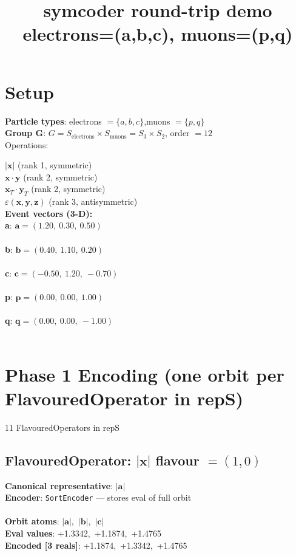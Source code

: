 \documentclass[a4paper,11pt]{article}
\title{symcoder round-trip demo\\\large electrons=(a,b,c),  muons=(p,q)}
\date{}
\newcommand{\vc}[1]{\ensuremath{\mathbf{#1}}}
\newcommand{\dnfagmiihhiejm}[1]{|\vc{#1}|}
\newcommand{\pdcegfomjfhook}[2]{\mathbf{#1} \cdot \mathbf{#2}}
\newcommand{\fpbeomcfokjooi}[2]{\mathbf{#1}_T \cdot \mathbf{#2}_T}
\newcommand{\kblbmcpggoncpf}[3]{\varepsilon(\mathbf{#1},\mathbf{#2},\mathbf{#3})}
\begin{document}
\maketitle

\section{Setup}
\textbf{Particle types}: electrons $= \{a, b, c\}$,\quad muons $= \{p, q\}$\\
\textbf{Group G}: $G = S_{\text{electrons}} \times S_{\text{muons}} = S_{3} \times S_{2}$, order $= 12$\\

Operations:

$\dnfagmiihhiejm{x}$ \quad (rank 1, symmetric)\\
$\pdcegfomjfhook{x}{y}$ \quad (rank 2, symmetric)\\
$\fpbeomcfokjooi{x}{y}$ \quad (rank 2, symmetric)\\
$\kblbmcpggoncpf{x}{y}{z}$ \quad (rank 3, antisymmetric)\\

\textbf{Event vectors (3-D):}\\
\textbf{  a}: $\vc{a} = (1.20,\ 0.30,\ 0.50)$\\\\
\textbf{  b}: $\vc{b} = (0.40,\ 1.10,\ 0.20)$\\\\
\textbf{  c}: $\vc{c} = (-0.50,\ 1.20,\ -0.70)$\\\\
\textbf{  p}: $\vc{p} = (0.00,\ 0.00,\ 1.00)$\\\\
\textbf{  q}: $\vc{q} = (0.00,\ 0.00,\ -1.00)$\\\\

\section{Phase 1 Encoding  (one orbit per FlavouredOperator in repS)}
  11 FlavouredOperators in repS


\subsection{FlavouredOperator: $\dnfagmiihhiejm{x}$  flavour $= (1, 0)$}
\textbf{  Canonical representative}: $\displaystyle\dnfagmiihhiejm{a}$\\
\textbf{  Encoder}: \texttt{SortEncoder} — stores eval of full orbit\\\\
\textbf{  Orbit atoms}: $\dnfagmiihhiejm{a}$,\ $\dnfagmiihhiejm{b}$,\ $\dnfagmiihhiejm{c}$\\
\textbf{  Eval values}: +1.3342,\ +1.1874,\ +1.4765\\
\textbf{  Encoded [3 reals]}: +1.1874,\ +1.3342,\ +1.4765\\
\end{document}

